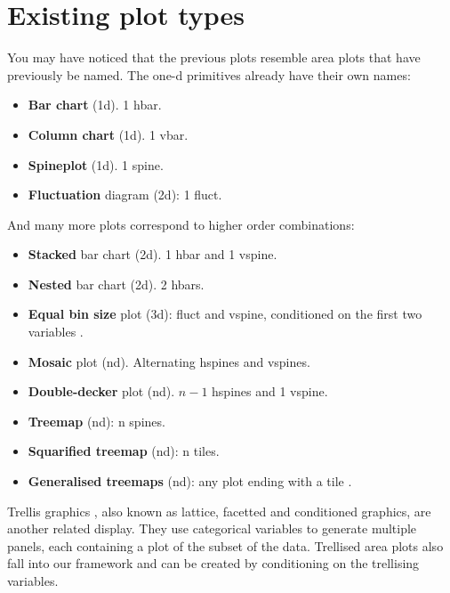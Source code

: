 \documentclass[journal]{vgtc}
\begin{document}
\section{Existing plot types}

You may have noticed that the previous plots resemble area plots that have previously be named. The one-d primitives already have their own names:

\begin{itemize}
  \item {\bf Bar chart} (1d). 1 hbar.
  \item {\bf Column chart} (1d). 1 vbar.
  \item {\bf Spineplot} (1d). 1 spine.
  \item {\bf Fluctuation} diagram (2d): 1 fluct.
\end{itemize}

\noindent And many more plots correspond to higher order combinations:

\begin{itemize}
  \item {\bf Stacked} bar chart (2d). 1 hbar and 1 vspine.

  \item {\bf Nested} bar chart (2d).  2 hbars. \citep{peltier:2009}

  \item {\bf Equal bin size} plot (3d): fluct and vspine, conditioned on the first two variables \citep{hofmann:2000}.

  \item {\bf Mosaic} plot (nd).  Alternating hspines and vspines.  \citep{hartigan:1981,friendly:1994,hofmann:2003}

  \item {\bf Double-decker} plot (nd).  $n-1$ hspines and 1 vspine. \citep{hofmann:2001}

  \item {\bf Treemap} (nd): n spines. \citep{shneiderman:1992}

  \item {\bf Squarified treemap} (nd): n tiles. \citep{bruls:1999}

  \item {\bf Generalised treemaps} (nd): any plot ending with a tile \citep{vliegen:2006}.

\end{itemize}

Trellis graphics \citep{becker:1996}, also known as lattice, facetted and conditioned graphics, are another related display. They use categorical variables to generate multiple panels, each containing a plot of the subset of the data. Trellised area plots also fall into our framework and can be created by conditioning on the trellising variables.
\end{document}
